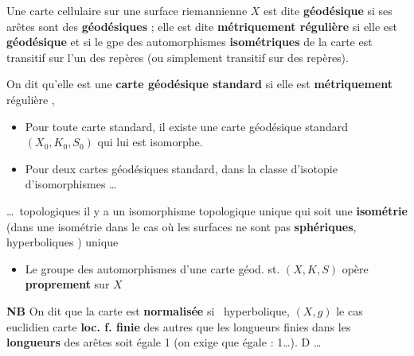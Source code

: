 \documentclass[11pt,a4paper]{article}
\begin{document}
Une carte cellulaire sur une surface riemannienne $X$ est dite
\textbf{géodésique} si  ses arêtes sont des 
\textbf{géodésiques} ; elle est dite \textbf{métriquement régulière} si elle
est \textbf{géodésique} et si le gpe des automorphismes \textbf{isométriques}
de la carte est transitif sur l'un des repères (ou simplement transitif sur
\ill{} des repères).

On dit qu'elle est une \textbf{carte géodésique standard} si elle est
\textbf{métriquement} régulière ,
 \ill{}   

\begin{itemize}
  \item[a)] Pour toute carte standard, il existe  une carte
    géodésique standard $(X_0, K_0, S_0)$ qui lui est
     isomorphe.
  \item[b)] \struck{\ill{}} Pour deux cartes géodésiques standard, dans la
    classe d'isotopie d'isomorphismes \ldots
\end{itemize}



\ldots\ topologiques il y a un isomorphisme topologique unique qui soit une
\struck{\ill{}} \textbf{isométrie} (dans une isométrie dans le cas où les
surfaces ne sont pas  \textbf{sphériques}, \ill{}
hyperboliques \ill{}) unique

\begin{itemize}
  \item[c)] Le groupe des automorphismes \ill{} d'une carte géod. st.
    $(X, K, S)$ opère \textbf{proprement} sur $X$ \ill{}
\end{itemize}

\textbf{NB} On dit que la carte \ill{} est \textbf{normalisée} si \ill{}
\ill{}\ hyperbolique, $(X, g)$ \ill{} le cas euclidien \ill{} carte
\struck{\ill{}} \textbf{loc. f. finie} \ill{} des autres \ill{} \ill{} que les
longueurs \ill{} finies dans les \textbf{longueurs} \ill{} des arêtes soit
égale  1 (on \ill{}  exige que \ill{} égale :
1\ldots). D\ill{} \ldots

\end{document}
